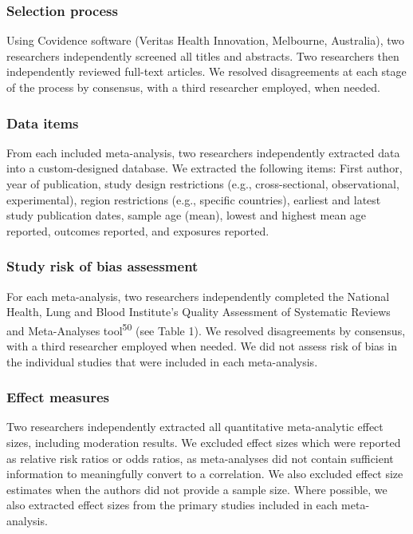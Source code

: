 \documentclass[
  english,
  man]{apa6}
\begin{document}
\hypertarget{selection-process}{%
\subsubsection{Selection process}\label{selection-process}}

Using Covidence software (Veritas Health Innovation, Melbourne, Australia), two researchers independently screened all titles and abstracts.
Two researchers then independently reviewed full-text articles.
We resolved disagreements at each stage of the process by consensus, with a third researcher employed, when needed.

\hypertarget{data-items}{%
\subsubsection{Data items}\label{data-items}}

From each included meta-analysis, two researchers independently extracted data into a custom-designed database.
We extracted the following items: First author, year of publication, study design restrictions (e.g., cross-sectional, observational, experimental), region restrictions (e.g., specific countries), earliest and latest study publication dates, sample age (mean), lowest and highest mean age reported, outcomes reported, and exposures reported.

\hypertarget{study-risk-of-bias-assessment}{%
\subsubsection{Study risk of bias assessment}\label{study-risk-of-bias-assessment}}

For each meta-analysis, two researchers independently completed the National Health, Lung and Blood Institute's Quality Assessment of Systematic Reviews and Meta-Analyses tool\textsuperscript{50} (see Table 1).
We resolved disagreements by consensus, with a third researcher employed when needed.
We did not assess risk of bias in the individual studies that were included in each meta-analysis.

\hypertarget{effect-measures}{%
\subsubsection{Effect measures}\label{effect-measures}}

Two researchers independently extracted all quantitative meta-analytic effect sizes, including moderation results.
We excluded effect sizes which were reported as relative risk ratios or odds ratios, as meta-analyses did not contain sufficient information to meaningfully convert to a correlation.
We also excluded effect size estimates when the authors did not provide a sample size.
Where possible, we also extracted effect sizes from the primary studies included in each meta-analysis.
\end{document}
